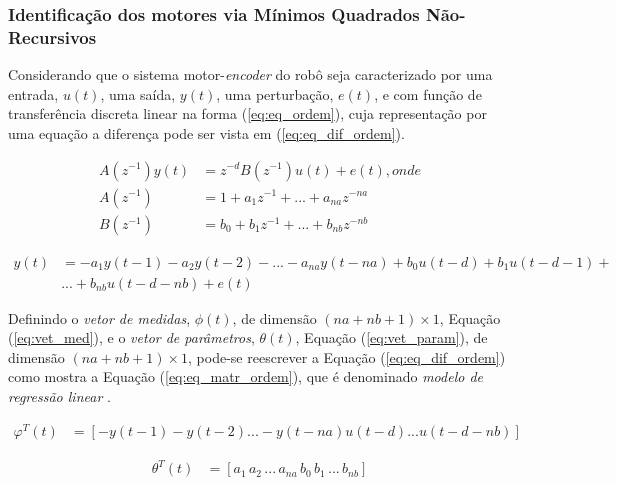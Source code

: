 	
	
	\subsubsection{Identificação dos motores via Mínimos Quadrados Não-Recursivos}
	Considerando que o sistema motor-\textit{encoder} do robô seja caracterizado por uma entrada, $u(t)$, uma saída, $y(t)$, uma perturbação, $e(t)$, e com função de transferência discreta linear na forma (\ref{eq:eq_ordem}), cuja representação por uma equação a diferença pode ser vista em (\ref{eq:eq_dif_ordem}).
	

\begin{equation}
	\label{eq:eq_ordem}
	\begin{split}
	A(z^{-1})y(t) &= z^{-d}B(z^{-1})u(t)+e(t), onde \\
	A(z^{-1}) &= 1 + a_{1}z^{-1} + ... + a_{na}z^{-na}\\
	B(z^{-1}) &= b_0 + b_1z^{-1} + ... + b_{nb}z^{-nb}
	\end{split}
\end{equation}

\begin{equation}
	\label{eq:eq_dif_ordem}
	\begin{split}
	y(t) &= -a_1y(t-1) - a_2y(t-2) - ... - a_{na}y(t-na) + b_0u(t-d) + b_1u(t-d-1) + \\ &... + b_{nb}u(t-d-nb) + e(t)
	\end{split}
\end{equation}

Definindo o \emph{vetor de medidas}, $\phi(t)$, de dimensão $(na + nb + 1) \times 1$, Equação (\ref{eq:vet_med}), e o \emph{vetor de parâmetros}, $\theta(t)$, Equação (\ref{eq:vet_param}), de dimensão $(na + nb + 1) \times 1$, pode-se reescrever a Equação (\ref{eq:eq_dif_ordem}) como mostra a Equação (\ref{eq:eq_matr_ordem}), que é denominado \emph{modelo de regressão linear} \cite{COELHO:2015}.

\begin{equation}
	\label{eq:vet_med}
	\begin{split}
	{\varphi}^T(t) &= [-y(t-1)-y(t-2)...-y(t-na) u(t-d) ... u(t-d-nb)]
	\end{split}
\end{equation}

\begin{equation}
	\label{eq:vet_param}
	\begin{split}
	{\theta}^T(t) &= [a_1 \, a_2 \, ... \, a_{na} \, b_0 \, b_1 \, ... \, b_{nb}]
	\end{split}
\end{equation}

